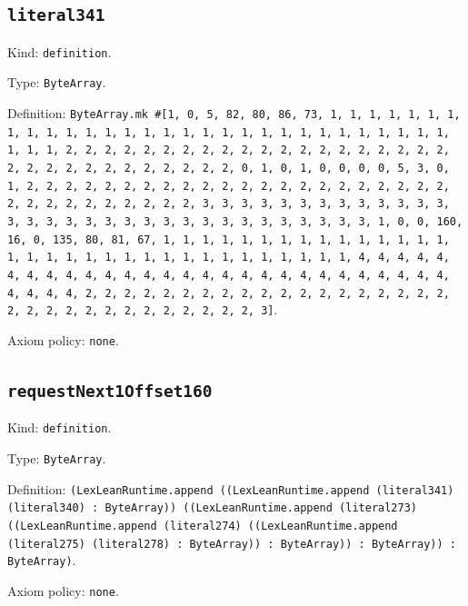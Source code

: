 \documentclass[11pt]{article}
\begin{document}
\subsection*{\texttt{literal341}}
\noindent Kind: \texttt{definition}.\par
\noindent Type: \texttt{ByteArray}.\par
\noindent Definition: \texttt{ByteArray.mk \#[1, 0, 5, 82, 80, 86, 73, 1, 1, 1, 1, 1, 1, 1, 1, 1, 1, 1, 1, 1, 1, 1, 1, 1, 1, 1, 1, 1, 1, 1, 1, 1, 1, 1, 1, 1, 1, 1, 1, 1, 2, 2, 2, 2, 2, 2, 2, 2, 2, 2, 2, 2, 2, 2, 2, 2, 2, 2, 2, 2, 2, 2, 2, 2, 2, 2, 2, 2, 2, 2, 2, 2, 0, 1, 0, 1, 0, 0, 0, 0, 5, 3, 0, 1, 2, 2, 2, 2, 2, 2, 2, 2, 2, 2, 2, 2, 2, 2, 2, 2, 2, 2, 2, 2, 2, 2, 2, 2, 2, 2, 2, 2, 2, 2, 2, 2, 3, 3, 3, 3, 3, 3, 3, 3, 3, 3, 3, 3, 3, 3, 3, 3, 3, 3, 3, 3, 3, 3, 3, 3, 3, 3, 3, 3, 3, 3, 3, 3, 1, 0, 0, 160, 16, 0, 135, 80, 81, 67, 1, 1, 1, 1, 1, 1, 1, 1, 1, 1, 1, 1, 1, 1, 1, 1, 1, 1, 1, 1, 1, 1, 1, 1, 1, 1, 1, 1, 1, 1, 1, 1, 1, 4, 4, 4, 4, 4, 4, 4, 4, 4, 4, 4, 4, 4, 4, 4, 4, 4, 4, 4, 4, 4, 4, 4, 4, 4, 4, 4, 4, 4, 4, 4, 4, 2, 2, 2, 2, 2, 2, 2, 2, 2, 2, 2, 2, 2, 2, 2, 2, 2, 2, 2, 2, 2, 2, 2, 2, 2, 2, 2, 2, 2, 2, 2, 2, 3]}.\par
\noindent Axiom policy: \texttt{none}.\par
\subsection*{\texttt{requestNext1Offset160}}
\noindent Kind: \texttt{definition}.\par
\noindent Type: \texttt{ByteArray}.\par
\noindent Definition: \texttt{(LexLeanRuntime.append ((LexLeanRuntime.append (literal341) (literal340) : ByteArray)) ((LexLeanRuntime.append (literal273) ((LexLeanRuntime.append (literal274) ((LexLeanRuntime.append (literal275) (literal278) : ByteArray)) : ByteArray)) : ByteArray)) : ByteArray)}.\par
\noindent Axiom policy: \texttt{none}.\par
\end{document}
